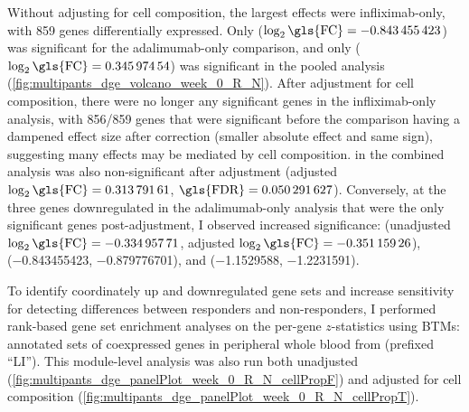 Without adjusting for cell composition, the largest effects were infliximab-only, with 859 genes differentially expressed.
Only  ($\log_2\text{\gls{FC}}=\num{-0.843455423}$) was significant for the adalimumab-only comparison, 
and only  ($\log_2\text{\gls{FC}} = \num{0.34597454}$) was significant in the pooled analysis (\cref{fig:multipants_dge_volcano_week_0_R_N}).
%
After adjustment for cell composition, there were no longer any significant genes in the infliximab-only analysis, 
with 856/859 genes that were significant before the comparison having a dampened effect size after correction (smaller absolute effect and same sign), suggesting many effects may be mediated by cell composition.
 in the combined analysis was also non-significant after adjustment (adjusted $\log_2\text{\gls{FC}} = \num{0.31379161}$, $\text{\gls{FDR}}=\num{0.050291627}$).
Conversely, at the three genes downregulated in the adalimumab-only analysis that were the only significant genes post-adjustment, I observed increased significance:
 (unadjusted $\log_2\text{\gls{FC}} = \num{-0.33495771}$, adjusted $\log_2\text{\gls{FC}} = \num{-0.35115926}$), 
 (\num{-0.843455423}, \num{-0.879776701}), 
and  (\num{-1.1529588}, \num{-1.2231591}).

To identify coordinately up and downregulated gene sets and increase sensitivity for detecting differences between responders and non-responders,
I performed rank-based gene set enrichment analyses on the per-gene $z$-statistics using \glspl{BTM}: annotated sets of coexpressed genes in peripheral whole blood from \textcite{li2013MolecularSignaturesAntibody} (prefixed \enquote{LI}).
This module-level analysis was also run both unadjusted (\cref{fig:multipants_dge_panelPlot_week_0_R_N_cellPropF}) and adjusted for cell composition (\cref{fig:multipants_dge_panelPlot_week_0_R_N_cellPropT}).

